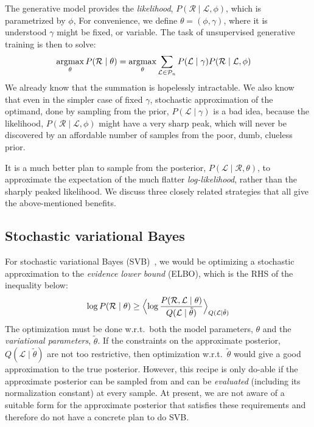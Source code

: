 \documentclass[a4paper,oneside,12pt,english]{report}
\DeclareMathOperator*{\argmax}{argmax}
\def\Expv#1#2{\Bigl\langle#1\Bigr\rangle_{#2}}
\def\Lset{\mathcal{L}}
\def\Rset{\mathcal{R}}
\begin{document}
The generative model provides the \emph{likelihood}, $P(\Rset\mid\Lset,\phi)$, which is parametrized by $\phi$,  For convenience, we define $\theta=(\phi,\gamma)$, where it is understood $\gamma$ might be fixed, or variable. The task of unsupervised generative training is then to solve:
\begin{align}
\argmax_{\theta} P(\Rset\mid\theta) &= \argmax_{\theta} \sum_{\Lset\in\Pset_n} P(\Lset\mid\gamma) P(\Rset\mid\Lset,\phi)
\end{align} 
We already know that the summation is hopelessly intractable. We also know that even in the simpler case of fixed $\gamma$, stochastic approximation of the optimand, done by sampling from the prior, $P(\Lset\mid\gamma)$ is a bad idea, because the likelihood, $P(\Rset\mid\Lset,\phi)$ might have a very sharp peak, which will never be discovered by an affordable number of samples from the poor, dumb, clueless prior. 

It is a much better plan to sample from the posterior, $P(\Lset\mid\Rset,\theta)$, to approximate the expectation of the much flatter \emph{log-likelihood}, rather than the sharply peaked likelihood. We discuss three closely related strategies that all give the above-mentioned benefits.

\subsection{Stochastic variational Bayes}
For stochastic variational Bayes (SVB)~\cite{SVI_Hoffman,VAE,Titsias}, we would be optimizing a stochastic approximation to the \emph{evidence lower bound} (ELBO), which is the RHS of the inequality below:
\begin{align}
\log P(\Rset\mid\theta) \ge \Expv{\log\frac{P(\Rset,\Lset\mid\theta)}{Q(\Lset\mid\tilde\theta)}}{Q(\Lset\mid\tilde\theta)}
\end{align}
The optimization must be done w.r.t.\ both the model parameters, $\theta$ and the \emph{variational parameters}, $\tilde\theta$.  If the constraints on the approximate posterior, $Q(\Lset\mid\tilde\theta)$ are not too restrictive, then optimization w.r.t.\ $\tilde\theta$ would give a good approximation to the true posterior. However, this recipe is only do-able if the approximate posterior can be sampled from and can be \emph{evaluated} (including its normalization constant) at every sample. At present, we are not aware of a suitable form for the approximate posterior that satisfies these requirements and therefore do not have a concrete plan to do SVB.    
\end{document}

